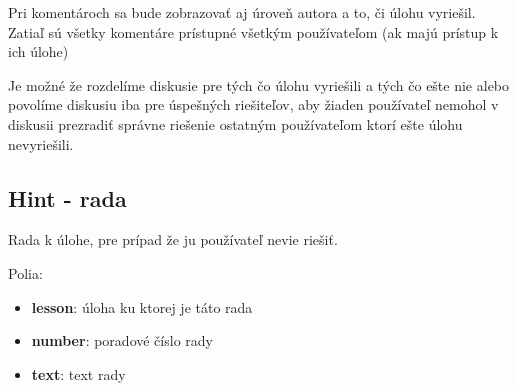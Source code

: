Pri komentároch sa bude zobrazovať aj úroveň autora a to, či úlohu vyriešil.
Zatiaľ sú všetky komentáre prístupné všetkým používateľom (ak majú prístup k ich úlohe)

Je možné že rozdelíme diskusie pre tých čo úlohu vyriešili a tých čo ešte nie
alebo povolíme diskusiu iba pre úspešných riešiteľov, aby žiaden používateľ nemohol
v diskusii prezradiť správne riešenie ostatným používateľom ktorí ešte úlohu nevyriešili.

\subsection{Hint - rada}
Rada k úlohe, pre prípad že ju používateľ nevie riešiť.

Polia:
\begin{itemize}
\item \textbf{lesson}: úloha ku ktorej je táto rada
\item \textbf{number}: poradové číslo rady
\item \textbf{text}: text rady
\end{itemize}
